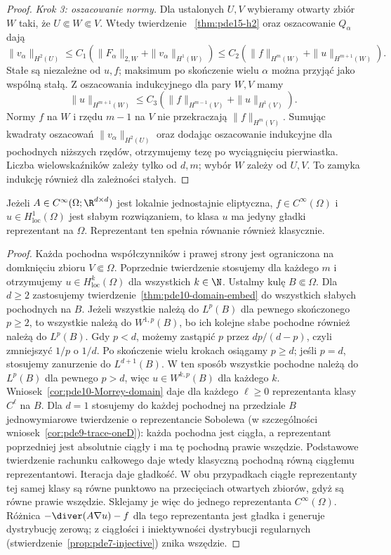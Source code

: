 \begin{proof}
\emph{Krok 3: oszacowanie normy.}
Dla ustalonych $U,V$ wybieramy otwarty zbiór $W$ taki,
że $U\Subset W\Subset V$. Wtedy twierdzenie
~\ref{thm:pde15-h2} oraz oszacowanie $Q_\alpha$ dają
\[
 \|v_\alpha\|_{H^2(U)}
 \le C_1(\|F_\alpha\|_{2,W}+\|v_\alpha\|_{H^1(W)})
 \le C_2(\|f\|_{H^m(W)}+\|u\|_{H^{m+1}(W)}).
\]
Stałe są niezależne od $u,f$; maksimum po skończenie wielu
$\alpha$ można przyjąć jako wspólną stałą.
Z oszacowania indukcyjnego dla pary $W,V$ mamy
\[
 \|u\|_{H^{m+1}(W)}
 \le C_3(\|f\|_{H^{m-1}(V)}+\|u\|_{H^1(V)}).
\]
Normy $f$ na $W$ i rzędu $m-1$ na $V$ nie przekraczają
$\|f\|_{H^m(V)}$. Sumując kwadraty oszacowań
$\|v_\alpha\|_{H^2(U)}$ oraz dodając oszacowanie indukcyjne
dla pochodnych niższych rzędów, otrzymujemy tezę
po wyciągnięciu pierwiastka. Liczba wielowskaźników
zależy tylko od $d,m$; wybór $W$ zależy od $U,V$.
To zamyka indukcję również dla zależności stałych.
\end{proof}

\begin{wniosek}
Jeżeli $A\in C^\infty(\Omega;\R^{d\times d})$ jest lokalnie
jednostajnie eliptyczna, $f\in C^\infty(\Omega)$ i
$u\in H^1_{\mathrm{loc}}(\Omega)$ jest słabym rozwiązaniem,
to klasa $u$ ma jedyny gładki reprezentant na $\Omega$.
Reprezentant ten spełnia równanie również klasycznie.
\end{wniosek}
\begin{proof}
Każda pochodna współczynników i prawej strony jest
ograniczona na domknięciu zbioru $V\Subset\Omega$.
Poprzednie twierdzenie stosujemy dla każdego $m$
i otrzymujemy $u\in H^k_{\mathrm{loc}}(\Omega)$
dla wszystkich $k\in\N$.
Ustalmy kulę $B\Subset\Omega$. Dla $d\ge2$ zastosujemy
twierdzenie~\ref{thm:pde10-domain-embed} do wszystkich
słabych pochodnych na $B$. Jeżeli wszystkie należą do
$L^p(B)$ dla pewnego skończonego $p\ge2$, to wszystkie
należą do $W^{1,p}(B)$, bo ich kolejne słabe pochodne
również należą do $L^p(B)$. Gdy $p<d$, możemy zastąpić
$p$ przez $dp/(d-p)$, czyli zmniejszyć $1/p$ o $1/d$.
Po skończenie wielu krokach osiągamy $p\ge d$;
jeśli $p=d$, stosujemy zanurzenie do $L^{d+1}(B)$.
W ten sposób wszystkie pochodne należą do $L^p(B)$
dla pewnego $p>d$, więc $u\in W^{k,p}(B)$ dla każdego $k$.
Wniosek~\ref{cor:pde10-Morrey-domain} daje dla każdego
$\ell\ge0$ reprezentanta klasy $C^\ell$ na $B$.
Dla $d=1$ stosujemy do każdej pochodnej na przedziale $B$
jednowymiarowe twierdzenie o reprezentancie Sobolewa
(w szczególności wniosek~\ref{cor:pde9-trace-oneD}):
każda pochodna jest ciągła, a reprezentant poprzedniej
jest absolutnie ciągły i ma tę pochodną prawie wszędzie.
Podstawowe twierdzenie rachunku całkowego daje wtedy
klasyczną pochodną równą ciągłemu reprezentantowi.
Iteracja daje gładkość. W obu przypadkach ciągłe
reprezentanty tej samej klasy są równe punktowo na
przecięciach otwartych zbiorów, gdyż są równe prawie
wszędzie. Sklejamy je więc do jednego reprezentanta
$C^\infty(\Omega)$. Różnica $-\diver(A\nabla u)-f$
dla tego reprezentanta jest gładka i generuje dystrybucję
zerową; z ciągłości i iniektywności dystrybucji regularnych
(stwierdzenie~\ref{prop:pde7-injective}) znika wszędzie.
\end{proof}

